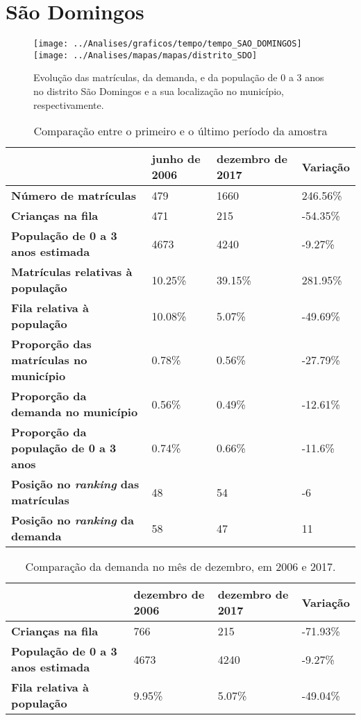 \section{São Domingos}
\begin{figure}[H]
	\centering
	\texttt{[image: ../Analises/graficos/tempo/tempo\_SAO\_DOMINGOS]}
	\texttt{[image: ../Analises/mapas/mapas/distrito\_SDO]}
	\caption{Evolução das matrículas, da demanda, e da população de 0 a 3 anos no distrito São Domingos e a sua localização no município, respectivamente.}
\end{figure}
\begin{table}[H]
	\begin{tabular}{|l|l|l|l|}
		\hline
		\textbf{}                                      & \textbf{junho de 2006}       & \textbf{dezembro de 2017}    & \textbf{Variação} \\ \hline
		\textbf{Número de matrículas}                  & 479 & 1660 & 246.56\% \\ \hline
		\textbf{Crianças na fila}                      & 471 & 215 & -54.35\% \\ \hline
		\textbf{População de 0 a 3 anos estimada}      & 4673 & 4240 & -9.27\% \\ \hline
		\textbf{Matrículas relativas à população}      & 10.25\% & 39.15\% & 281.95\% \\ \hline
		\textbf{Fila relativa à população}             & 10.08\% & 5.07\% & -49.69\% \\ \hline
		\textbf{Proporção das matrículas no município} & 0.78\% & 0.56\% & -27.79\% \\ \hline
		\textbf{Proporção da demanda no município}     & 0.56\% & 0.49\% & -12.61\% \\ \hline
		\textbf{Proporção da população de 0 a 3 anos}  & 0.74\% & 0.66\% & -11.6\% \\ \hline
		\textbf{Posição no \textit{ranking} das matrículas}     & 48 & 54 & -6 \\ \hline
		\textbf{Posição no \textit{ranking} da demanda}         & 58 & 47 & 11 \\ \hline
	\end{tabular}
	\caption{Comparação entre o primeiro e o último período da amostra}
\end{table}
\begin{table}[H]
	\begin{tabular}{|l|l|l|l|}
		\hline
		\textbf{}                                 & \textbf{dezembro de 2006} & \textbf{dezembro de 2017} & \textbf{Variação} \\ \hline
		\textbf{Crianças na fila}                      & 766 & 215 & -71.93\% \\ \hline
		\textbf{População de 0 a 3 anos estimada}      & 4673 & 4240 & -9.27\% \\ \hline
		\textbf{Fila relativa à população}             & 9.95\% & 5.07\% & -49.04\% \\ \hline
	\end{tabular}
	\caption{Comparação da demanda no mês de dezembro, em 2006 e 2017.}
\end{table}
